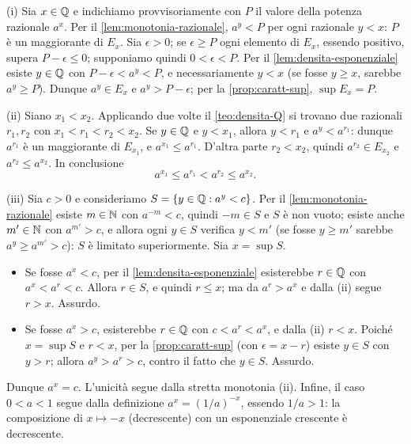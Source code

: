 \begin{dimostrazione}
(i) Sia $x\in\mathbb{Q}$ e indichiamo provvisoriamente con $P$ il valore della potenza razionale
$a^{x}$. Per il \cref{lem:monotonia-razionale}, $a^{y}<P$ per ogni razionale $y<x$:
$P$ è un maggiorante di $E_{x}$. Sia $\epsilon>0$; se $\epsilon\ge P$ ogni elemento di
$E_{x}$, essendo positivo, supera $P-\epsilon\le0$; supponiamo quindi $0<\epsilon<P$. Per il
\cref{lem:densita-esponenziale} esiste $y\in\mathbb{Q}$ con $P-\epsilon<a^{y}<P$, e
necessariamente $y<x$ (se fosse $y\ge x$, sarebbe $a^{y}\ge P$). Dunque $a^{y}\in E_{x}$ e
$a^{y}>P-\epsilon$; per la \cref{prop:caratt-sup}, $\sup E_{x}=P$.

(ii) Siano $x_{1}<x_{2}$. Applicando due volte il \cref{teo:densita-Q} si trovano due
razionali $r_{1},r_{2}$ con $x_{1}<r_{1}<r_{2}<x_{2}$. Se $y\in\mathbb{Q}$ e $y<x_{1}$, allora
$y<r_{1}$ e $a^{y}<a^{r_{1}}$: dunque $a^{r_{1}}$ è un maggiorante di $E_{x_{1}}$, e
$a^{x_{1}}\le a^{r_{1}}$. D'altra parte $r_{2}<x_{2}$, quindi $a^{r_{2}}\in E_{x_{2}}$ e
$a^{r_{2}}\le a^{x_{2}}$. In conclusione
\[
  a^{x_{1}}\le a^{r_{1}}<a^{r_{2}}\le a^{x_{2}} .
\]

(iii) Sia $c>0$ e consideriamo $S=\{y\in\mathbb{Q} : a^{y}<c\}$. Per il
\cref{lem:monotonia-razionale} esiste $m\in\mathbb{N}$ con $a^{-m}<c$, quindi $-m\in S$ e $S$ è
non vuoto; esiste anche $m'\in\mathbb{N}$ con $a^{m'}>c$, e allora ogni $y\in S$ verifica $y<m'$
(se fosse $y\ge m'$ sarebbe $a^{y}\ge a^{m'}>c$): $S$ è limitato superiormente. Sia
$x=\sup S$.
\begin{itemize}
  \item Se fosse $a^{x}<c$, per il \cref{lem:densita-esponenziale} esisterebbe
  $r\in\mathbb{Q}$ con $a^{x}<a^{r}<c$. Allora $r\in S$, e quindi $r\le x$; ma da $a^{r}>a^{x}$ e
  dalla (ii) segue $r>x$. Assurdo.
  \item Se fosse $a^{x}>c$, esisterebbe $r\in\mathbb{Q}$ con $c<a^{r}<a^{x}$, e dalla (ii)
  $r<x$. Poiché $x=\sup S$ e $r<x$, per la \cref{prop:caratt-sup} (con $\epsilon=x-r$)
  esiste $y\in S$ con $y>r$; allora $a^{y}>a^{r}>c$, contro il fatto che $y\in S$.
  Assurdo.
\end{itemize}
Dunque $a^{x}=c$. L'unicità segue dalla stretta monotonia (ii). Infine, il caso
$0<a<1$ segue dalla definizione $a^{x}=(1/a)^{-x}$, essendo $1/a>1$: la composizione di
$x\mapsto-x$ (decrescente) con un esponenziale crescente è decrescente.
\end{dimostrazione}

